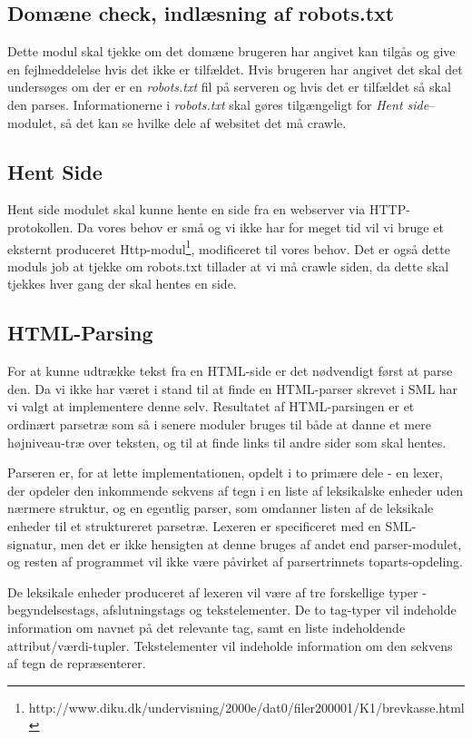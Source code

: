 \documentclass[a4paper,oneside,article, titlepage]{article}
\begin{document}
\subsection{Domæne check, indlæsning af robots.txt}
Dette modul skal tjekke om det domæne brugeren har angivet kan tilgås
og give en fejlmeddelelse hvis det ikke er tilfældet. Hvis brugeren
har angivet det skal det undersøges om der er en \textit{robots.txt}
fil på serveren og hvis det er tilfældet så skal den
parses. Informationerne i \textit{robots.txt} skal gøres tilgængeligt
for \textit{Hent side}--modulet, så det kan se hvilke dele af websitet
det må crawle.

\subsection{Hent Side}
Hent side modulet skal kunne hente en side fra en webserver via
HTTP-protokollen. Da vores behov er små og vi ikke har for meget tid
vil vi bruge et eksternt produceret
Http-modul\footnote{http://www.diku.dk/undervisning/2000e/dat0/filer200001/K1/brevkasse.html},
modificeret til vores behov. Det er også dette moduls job at tjekke om
robots.txt tillader at vi må crawle siden, da dette skal tjekkes hver
gang der skal hentes en side.

\subsection{HTML-Parsing}
For at kunne udtrække tekst fra en HTML-side er det nødvendigt først
at parse den. Da vi ikke har været i stand til at finde en HTML-parser
skrevet i SML har vi valgt at implementere denne selv. Resultatet af
HTML-parsingen er et ordinært parsetræ som så i senere moduler bruges
til både at danne et mere højniveau-træ over teksten, og til at finde
links til andre sider som skal hentes.

Parseren er, for at lette implementationen, opdelt i to primære dele -
en lexer, der opdeler den inkommende sekvens af tegn i en liste af
leksikalske enheder uden nærmere struktur, og en egentlig parser, som
omdanner listen af de leksikale enheder til et struktureret
parsetræ. Lexeren er specificeret med en SML-signatur, men det er ikke
hensigten at denne bruges af andet end parser-modulet, og resten af
programmet vil ikke være påvirket af parsertrinnets toparts-opdeling.

De leksikale enheder produceret af lexeren vil være af tre forskellige
typer - begyndelsestags, afslutningstags og tekstelementer. De to
tag-typer vil indeholde information om navnet på det relevante tag,
samt en liste indeholdende attribut/værdi-tupler. Tekstelementer vil
indeholde information om den sekvens af tegn de repræsenterer.
\end{document}
